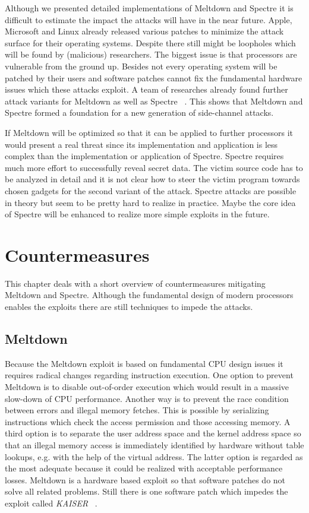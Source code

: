 \documentclass[a4paper,oneside,openright] {scrreprt}
\begin{document}
Although we presented detailed implementations of Meltdown and Spectre it is difficult to estimate the impact
the attacks will have in the near future. Apple, Microsoft and Linux already released various patches to minimize the attack
surface for their operating systems. 
Despite there still might be loopholes which will be found by (malicious) researchers.
The biggest issue is that processors are vulnerable from the ground up. 
Besides not every operating system will be patched by their users and 
software patches cannot fix the fundamental hardware issues which these attacks exploit.
A team of researches already found further attack variants for Meltdown as well as Spectre ~\cite{canella2018systematic}.
This shows that Meltdown and Spectre formed a foundation for a new generation of side-channel attacks.

If Meltdown will be optimized so that it can be applied to further processors it would present a real threat since its implementation
and application is less complex than the implementation or application of Spectre.  
Spectre requires much more effort to successfully reveal secret data.
The victim source code has to be analyzed in detail and it is not clear how to steer the victim program towards chosen gadgets
for the second variant of the attack. 
Spectre attacks are possible in theory but seem to be pretty hard to realize in practice.
Maybe the core idea of Spectre will be enhanced to realize more simple exploits in the future.


\chapter{Countermeasures}
\label{ch:countermeasures}

This chapter deals with a short overview of countermeasures mitigating Meltdown and Spectre. 
Although the fundamental design of modern processors enables the exploits there are still techniques to impede
the attacks.

\section{Meltdown}
\label{ch:intro:motivation}

Because the Meltdown exploit is based on fundamental CPU design issues it requires radical changes regarding instruction execution.
One option to prevent Meltdown is to disable out-of-order execution which would result in a massive slow-down of CPU performance.
Another way is to prevent the race condition between errors and illegal memory fetches. This is possible by serializing instructions
which check the access permission and those accessing memory.
A third option is to separate the user address space and the kernel address space so that an illegal memory access is immediately
identified by hardware without table lookups, e.g. with the help of the virtual address.
The latter option is regarded as the most adequate because it could be realized with acceptable performance losses.
Meltdown is a hardware based exploit so that software patches do not solve all related problems. 
Still there is one software patch which impedes the exploit called \textit{KAISER} ~\cite{gruss2017kaslr}.
\end{document}
